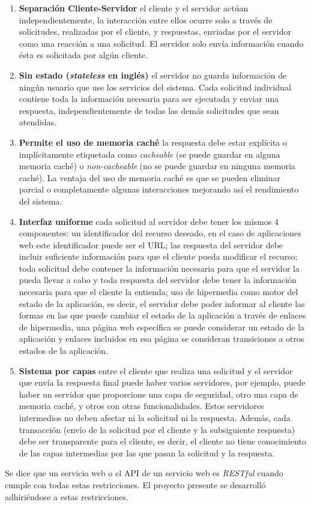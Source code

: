\begin{enumerate}
   \item \textbf{Separación Cliente-Servidor} el cliente y el servidor actúan independientemente, la interacción entre ellos ocurre solo a través de solicitudes, realizadas por el cliente, y respuestas, enviadas por el servidor como una reacción a una solicitud. El servidor solo envía información cuando ésta es solicitada por algún cliente.
   \item \textbf{Sin estado (\emph{stateless} en inglés)} el servidor no guarda información de ningún usuario que use los servicios del sistema. Cada solicitud individual contiene toda la información necesaria para ser ejecutada y enviar una respuesta, independientemente de todas las demás solicitudes que sean atendidas.
   \item \textbf{Permite el uso de memoria caché} la respuesta debe estar explícita o implícitamente etiquetada como \textit{cacheable} (se puede guardar en alguna memoria caché) o \textit{non-cacheable} (no se puede guardar en ninguna memoria caché). La ventaja del uso de memoria caché es que se pueden eliminar parcial o completamente algunas interacciones mejorando así el rendimiento del sistema.
   \item \textbf{Interfaz uniforme} cada solicitud al servidor debe tener los mismos 4 componentes: un identificador del recurso deseado, en el caso de aplicaciones web este identificador puede ser el URL; las respuesta del servidor debe incluir suficiente información para que el cliente pueda modificar el recurso; toda solicitud debe contener la información necesaria para que el servidor la pueda llevar a cabo y toda respuesta del servidor debe tener la información necesaria para que el cliente la entienda; uso de hipermedia como motor del estado de la aplicación, es decir, el servidor debe poder informar al cliente las formas en las que puede cambiar el estado de la aplicación a través de enlaces de hipermedia, una página web específica se puede considerar un estado de la aplicación y enlaces incluidos en esa página se consideran transiciones a otros estados de la aplicación.
   \item \textbf{Sistema por capas} entre el cliente que realiza una solicitud y el servidor que envía la respuesta final puede haber varios servidores, por ejemplo, puede haber un servidor que proporcione una capa de seguridad, otro una capa de memoria caché, y otros con otras funcionalidades. Estos servidores intermedios no deben afectar ni la solicitud ni la respuesta. Además, cada transacción (envío de la solicitud por el cliente y la subsiguiente respuesta) debe ser transparente para el cliente, es decir, el cliente no tiene conocimiento de las capas intermedias por las que pasan la solicitud y la respuesta.
\end{enumerate}

Se dice que un servicio web o el API de un servicio web es \textit{RESTful} cuando cumple con todas estas restricciones. El proyecto presente se desarrolló adhiriéndose a estas restricciones.
